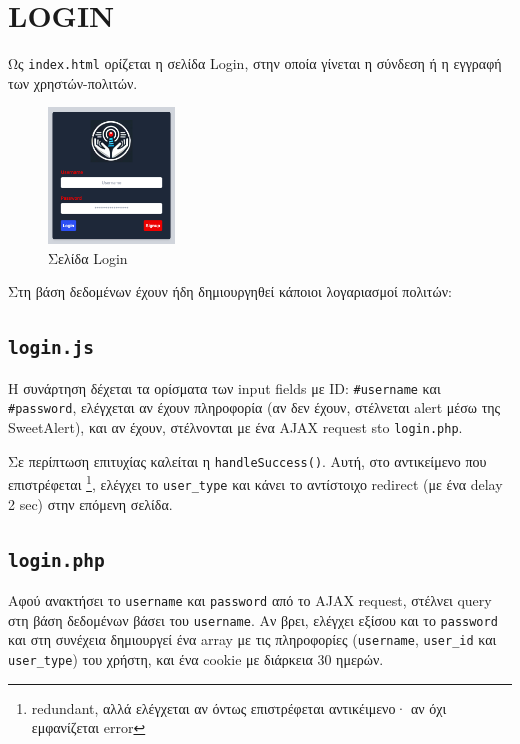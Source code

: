 \section{LOGIN}
    Ως \texttt{index.html} ορίζεται η σελίδα Login, στην οποία γίνεται η σύνδεση ή η εγγραφή των χρηστών-πολιτών.
    \begin{figure}[h!] \noindent \centering
        \includegraphics[width=0.3\textwidth]{img/login}
        \caption{Σελίδα Login}
    \end{figure}

    Στη βάση δεδομένων έχουν ήδη δημιουργηθεί κάποιοι λογαριασμοί πολιτών:


    \subsection{\texttt{login.js}}
        Η συνάρτηση  δέχεται τα ορίσματα των input fields με ID: \texttt{#username} και \texttt{#password},
            ελέγχεται αν έχουν πληροφορία (αν δεν έχουν, στέλνεται alert μέσω της SweetAlert), και αν έχουν,
            στέλνονται με ένα AJAX request sto \texttt{login.php}.

        Σε περίπτωση επιτυχίας καλείται η \texttt{handleSuccess()}.
        Αυτή, στο αντικείμενο που επιστρέφεται \footnote{redundant, αλλά ελέγχεται αν όντως επιστρέφεται αντικέιμενο· αν όχι εμφανίζεται error},
            ελέγχει το \texttt{user\_type} και κάνει το αντίστοιχο redirect (με ένα delay 2 sec) στην επόμενη σελίδα.

    \subsection{\texttt{login.php}}
        Αφού ανακτήσει το \texttt{username} και \texttt{password} από το AJAX request, στέλνει query στη βάση δεδομένων βάσει του \texttt{username}.
        Αν βρει, ελέγχει εξίσου και το \texttt{password} και στη συνέχεια δημιουργεί ένα array με τις πληροφορίες (\texttt{username}, \texttt{user\_id} και \texttt{user\_type}) του χρήστη, και ένα cookie με διάρκεια 30 ημερών.

